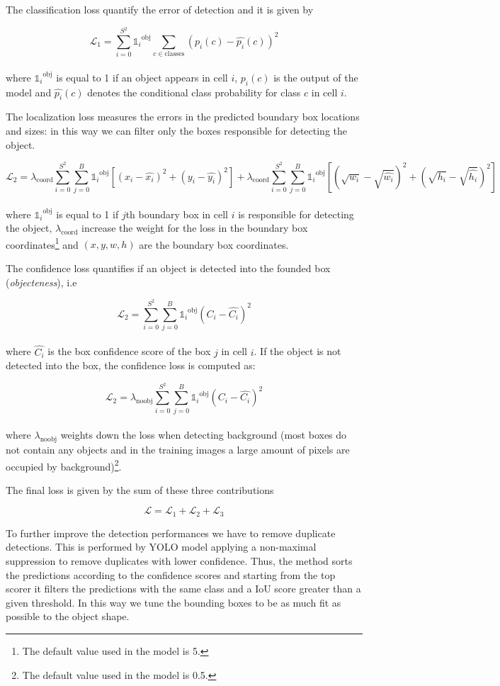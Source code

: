 \documentclass{standalone}
\begin{document}
The classification loss quantify the error of detection and it is given by

$$
\mathcal{L}_1 = \sum_{i=0}^{S^2} {\mathds{1}_i}^{\mbox{obj}} \sum_{c \in \mbox{classes}} \left(p_i(c) - \hat{p_i}(c)\right)^2
$$
\\where ${\mathds{1}_i}^{\mbox{obj}}$ is equal to 1 if an object appears in cell $i$, $p_i(c)$ is the output of the model and $\hat{p_i}(c)$ denotes the conditional class probability for class $c$ in cell $i$.

The localization loss measures the errors in the predicted boundary box locations and sizes: in this way we can filter only the boxes responsible for detecting the object.

$$
\mathcal{L}_2 = \lambda_{\mbox{coord}} \sum_{i=0}^{S^2}\sum_{j=0}^B {\mathds{1}_i}^{\mbox{obj}} \left[ (x_i - \hat{x_i})^2 + (y_i - \hat{y_i})^2 \right] + \lambda_{\mbox{coord}} \sum_{i=0}^{S^2}\sum_{j=0}^B {\mathds{1}_i}^{\mbox{obj}} \left[ (\sqrt{w_i} - \sqrt{\hat{w_i}})^2 + (\sqrt{h_i} - \sqrt{\hat{h_i}})^2 \right]
$$
\\
where ${\mathds{1}_i}^{\mbox{obj}}$ is equal to 1 if $j$th boundary box in cell $i$ is responsible for detecting the object, $\lambda_{\mbox{coord}}$ increase the weight for the loss in the boundary box coordinates\footnote{
  The default value used in the model is 5.
} and $(x, y, w, h)$ are the boundary box coordinates.

The confidence loss quantifies if an object is detected into the founded box (\emph{objecteness}), i.e

$$
\mathcal{L}_2 = \sum_{i=0}^{S^2}\sum_{j=0}^B {\mathds{1}_i}^{\mbox{obj}} \left(C_i - \hat{C_i} \right)^2
$$
\\
where $\hat{C_i}$ is the box confidence score of the box $j$ in cell $i$.
If the object is not detected into the box, the confidence loss is computed as:

$$
\mathcal{L}_2 = \lambda_{\mbox{noobj}}\sum_{i=0}^{S^2}\sum_{j=0}^B {\mathds{1}_i}^{\mbox{obj}} \left(C_i - \hat{C_i} \right)^2
$$
\\
where $\lambda_{\mbox{noobj}}$ weights down the loss when detecting background (most boxes do not contain any objects and in the training images a large amount of pixels are occupied by background)\footnote{
  The default value used in the model is 0.5.
}.

The final loss is given by the sum of these three contributions

$$
\mathcal{L} = \mathcal{L}_1 + \mathcal{L}_2 + \mathcal{L}_3
$$

To further improve the detection performances we have to remove duplicate detections.
This is performed by YOLO model applying a non-maximal suppression to remove duplicates with lower confidence.
Thus, the method sorts the predictions according to the confidence scores and starting from the top scorer it filters the predictions with the same class and a IoU score greater than a given threshold.
In this way we tune the bounding boxes to be as much fit as possible to the object shape.
\end{document}
